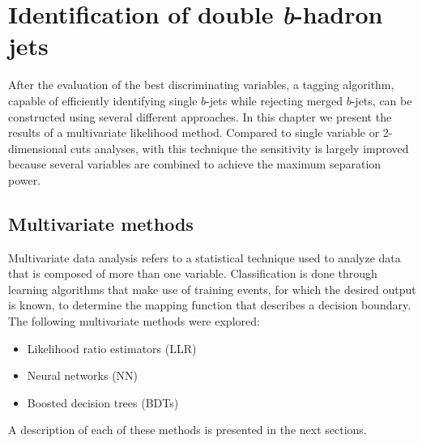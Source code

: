%
\chapter{Identification of double \emph{\textbf{b}}-hadron jets}\label{ch:mva}
%

After the evaluation of the best discriminating variables, a tagging algorithm, capable of efficiently identifying single $b$-jets while rejecting merged $b$-jets, can be constructed using several different approaches. In this chapter we present the results of a multivariate likelihood method. Compared to single variable or 2-dimensional cuts analyses, with this technique the sensitivity is largely improved because several variables are combined to achieve the maximum separation power.  

\section{Multivariate methods}\label{sec:mvamethods}

Multivariate data analysis refers to a statistical technique used to analyze data that %
 is composed of more than one variable.  Classification is done through learning algorithms that make use of training events,  for which the desired output is known, to determine the mapping function that describes a decision boundary. The following multivariate methods were explored: %

\begin{itemize}\addtolength{\itemsep}{-0.4\baselineskip}
\item
Likelihood ratio estimators (LLR)
\item
Neural networks (NN)
\item
Boosted decision trees (BDTs)
\end{itemize}

A description of each of these methods is presented in the next sections.

